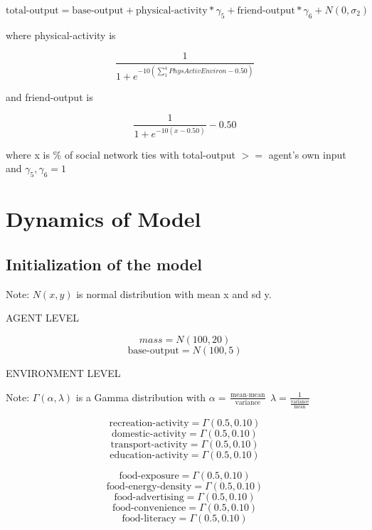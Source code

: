 \documentclass[12pt]{article}
\begin{document}
\begin{equation}
\text{total-output} = \text{base-output} + \text{physical-activity}*\gamma_5 + \text{friend-output}*\gamma_6 + N(0, \sigma_2)
\end{equation}

where  physical-activity is

\begin{equation}
\frac{1}{1 + e^{-10(\sum_{1}^{4}PhysActivEnviron - 0.50)}}
\end{equation}

and friend-output is

\begin{equation}
\frac{1}{1 + e^{-10(x - 0.50)}} - 0.50
\end{equation}


where x is \% of social network ties with total-output $>=$ agent's own input and $\gamma_5, \gamma_6 = 1$


\section{Dynamics of Model}

\subsection{Initialization of the model}

Note: $N(x,y)$ is normal distribution with mean x and sd y.

AGENT LEVEL

$$ mass = N(100, 20)$$
$$ \text{base-output} = N(100, 5)$$

ENVIRONMENT LEVEL

Note: $\Gamma(\alpha, \lambda)$ is a Gamma distribution with
$\alpha = \frac{\text{mean} \cdot \text{mean}}{\text{variance}}$
$\lambda = \frac{1}{\frac{\text{variance}}{\text{mean}}}$

$$ \text{recreation-activity} = \Gamma(0.5, 0.10) $$
$$ \text{domestic-activity} = \Gamma(0.5, 0.10) $$
$$ \text{transport-activity} = \Gamma(0.5, 0.10) $$
$$ \text{education-activity} = \Gamma(0.5, 0.10) $$

$$ \text{food-exposure} = \Gamma(0.5, 0.10) $$
$$ \text{food-energy-density} = \Gamma(0.5, 0.10) $$
$$ \text{food-advertising} = \Gamma(0.5, 0.10) $$
$$ \text{food-convenience} = \Gamma(0.5, 0.10) $$
$$ \text{food-literacy} = \Gamma(0.5, 0.10) $$
\end{document}
